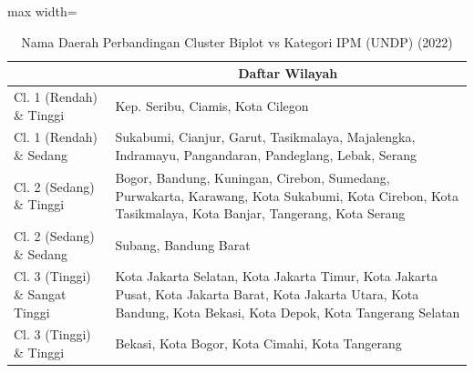 \begin{table}[H]
\centering
\caption{Nama Daerah Perbandingan Cluster Biplot vs Kategori IPM (UNDP) (2022)} \label{tab:app1crossname2022}
\begin{adjustbox}{max width=\textwidth}
\begin{tabular}{|>{\centering\arraybackslash}p{4cm}|p{10cm}|}
\hline
\multicolumn{1}{|c|}{\textbf{Kategori}} & \multicolumn{1}{c|}{\textbf{Daftar Wilayah}} \\
\hline
Cl. 1 (Rendah) \& Tinggi & Kep. Seribu, Ciamis, Kota Cilegon \\
\hline
Cl. 1 (Rendah) \& Sedang & Sukabumi, Cianjur, Garut, Tasikmalaya, Majalengka, Indramayu, Pangandaran, Pandeglang, Lebak, Serang \\
\hline
Cl. 2 (Sedang) \& Tinggi & Bogor, Bandung, Kuningan, Cirebon, Sumedang, Purwakarta, Karawang, Kota Sukabumi, Kota Cirebon, Kota Tasikmalaya, Kota Banjar, Tangerang, Kota Serang \\
\hline
Cl. 2 (Sedang) \& Sedang & Subang, Bandung Barat \\
\hline
Cl. 3 (Tinggi) \& Sangat Tinggi & Kota Jakarta Selatan, Kota Jakarta Timur, Kota Jakarta Pusat, Kota Jakarta Barat, Kota Jakarta Utara, Kota Bandung, Kota Bekasi, Kota Depok, Kota Tangerang Selatan \\
\hline
Cl. 3 (Tinggi) \& Tinggi & Bekasi, Kota Bogor, Kota Cimahi, Kota Tangerang \\
\hline
\end{tabular}
\end{adjustbox}
\end{table}